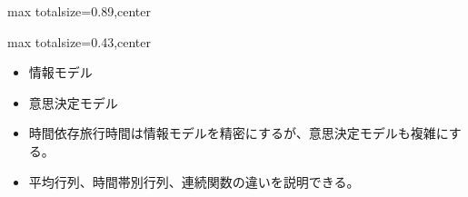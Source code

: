 \begin{minipage}[t]{0.58\textwidth}
\begin{adjustbox}{max totalsize={\textwidth}{0.89\textheight},center}
\begin{minipage}{\textwidth}
\end{minipage}
\end{adjustbox}
\end{minipage}


\clearpage
{}
\begin{minipage}[t]{0.405\textwidth}
\begin{adjustbox}{max totalsize={\textwidth}{0.43\textheight},center}
\begin{minipage}{\textwidth}\scriptsize
{}\begin{itemize}
\item 情報モデル
\item 意思決定モデル
\end{itemize}\begin{itemize}
\item 時間依存旅行時間は情報モデルを精密にするが、意思決定モデルも複雑にする。
\item 平均行列、時間帯別行列、連続関数の違いを説明できる。
\end{itemize}
\end{minipage}
\end{adjustbox}
\end{minipage}\hfill
